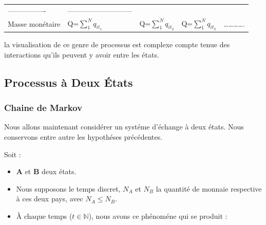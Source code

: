 \documentclass[11pt,]{article}
\begin{document}
\begin{longtable}[]{@{}lllll@{}}
\begin{minipage}[t]{0.10\columnwidth}
----------------\strut
\end{minipage} & \begin{minipage}[t]{0.44\columnwidth}\raggedright\strut
---------------------------\strut
\end{minipage}\tabularnewline
\begin{minipage}[t]{0.08\columnwidth}\raggedright\strut
Masse monétaire\strut
\end{minipage} & \begin{minipage}[t]{0.11\columnwidth}\raggedright\strut
Q=\(\sum_1^Nq_{it_1}\)\strut
\end{minipage} & \begin{minipage}[t]{0.11\columnwidth}\raggedright\strut
Q=\(\sum_1^Nq_{it_2}\)\strut
\end{minipage} & \begin{minipage}[t]{0.10\columnwidth}\raggedright\strut
Q=\(\sum_1^Nq_{it_3}\)\strut
\end{minipage} & \begin{minipage}[t]{0.44\columnwidth}\raggedright\strut
\ldots{}\ldots{}\ldots{}\ldots{}.\strut
\end{minipage}\tabularnewline
\bottomrule
\end{longtable}

la visualisation de ce genre de processus est complexe compte tenue des
interactions qu'ils peuvent y avoir entre les états.

\subsection{Processus à Deux États}\label{processus-a-deux-etats}

\subsubsection{Chaine de Markov}\label{chaine-de-markov}

Nous allons maintenant considérer un systéme d'échange à deux états.
Nous conservons entre autre les hypothéses précédentes.

Soit :

\begin{itemize}
\item
  \textbf{A} et \textbf{B} deux états.
\item
  Nous supposons le temps discret, \(N_A\) et \(N_B\) la quantité de
  monnaie respective à ces deux pays, avec \(N_A \leq N_B\).
\item
  À chaque temps (\(t \in \mathbb{N}\)), nous avons ce phénoméne qui se
  produit :
\end{itemize}
\end{document}
